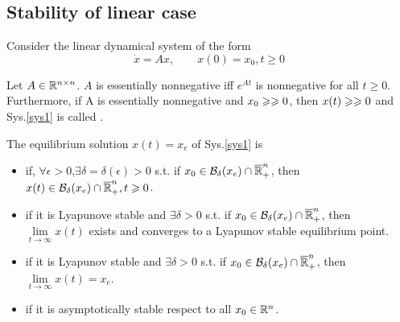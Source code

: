 \documentclass{paper}
\begin{document}
\subsection{Stability of linear case}
Consider the linear dynamical system of the form
\begin{equation}\label{sys1}
\dot{x}=Ax,\qquad x(0)=x_0, t\geqslant 0
\end{equation}
\begin{lem}\label{lem2}
Let $A\in \mathbb{R}^{n\times n}$. $A$ is essentially nonnegative iff $e^{At}$ is nonnegative for all $t\geqslant 0$.
Furthermore, if A is essentially nonnegative and $x_0\geqslant\geqslant 0$, then $x(t)\geqslant\geqslant 0$ and Sys.\ref{sys1} is
called .
\end{lem}
\begin{defi}
The equilibrium solution $x(t)=x_e$ of Sys.\ref{sys1} is 
\begin{itemize}
\item {} if, $\forall\epsilon>0$,$\exists \delta=\delta(\epsilon)>0$ s.t. if $x_0\in 
\mathcal{B}_{\delta}(x_e) \cap \overline{\mathbb{R}}_{+}^{n}$, then $x(t) \in \mathcal{B}_{\delta}(x_e) \cap \overline{\mathbb{R}}_{+}^{n}, t\geqslant 0$.
\item {} if it is Lyapunove stable and $\exists \delta>0$ s.t. if $x_0\in \mathcal{B}_{\delta}(x_e) \cap \overline{\mathbb{R}}_{+}^{n}$,
then $\lim\limits_{t\rightarrow\infty}x(t)$ exists and converges to a Lyapunov stable equilibrium point.
\item {} if it is Lyapunov stable and $\exists \delta>0$ s.t. if $x_0\in \mathcal{B}_{\delta}(x_e) \cap
\overline{\mathbb{R}}_{+}^{n}$, then $\lim\limits_{t\rightarrow\infty}x(t)=x_e$.
\item {} if it is asymptotically stable respect to all $x_0\in\mathbb{R}^{n}$.
\end{itemize}
\end{defi}
\end{document}
